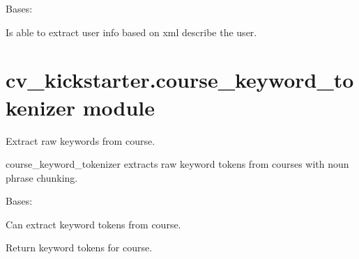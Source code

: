 \documentclass[letterpaper,10pt,english]{sphinxmanual}
\begin{document}

\begin{fulllineitems}
\label{cv_kickstarter:cv_kickstarter.cnapi.UserInfoExtractor}
Bases: {\hyperref[cv_kickstarter:cv_kickstarter.cnapi.AbstractXmlInfoExtractor]{}}

Is able to extract user info based on xml describe the user.

\end{fulllineitems}



\section{cv\_kickstarter.course\_keyword\_tokenizer module}
\label{cv_kickstarter:cv-kickstarter-course-keyword-tokenizer-module}\label{cv_kickstarter:module-cv_kickstarter.course_keyword_tokenizer}
Extract raw keywords from course.

course\_keyword\_tokenizer extracts raw keyword tokens from courses with
noun phrase chunking.

\begin{fulllineitems}
\label{cv_kickstarter:cv_kickstarter.course_keyword_tokenizer.CourseKeywordTokenizer}
Bases: 

Can extract keyword tokens from course.

\begin{fulllineitems}
\label{cv_kickstarter:cv_kickstarter.course_keyword_tokenizer.CourseKeywordTokenizer.keyword_tokens}
Return keyword tokens for course.

\end{fulllineitems}


\end{fulllineitems}

\end{document}
